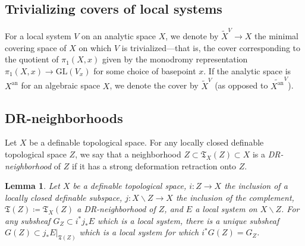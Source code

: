 \documentclass{amsart}
\newcommand{\bs}{\backslash}
\newcommand{\an}{\operatorname{an}}
\newtheorem{lemma}[theorem]{Lemma}
\theoremstyle{definition}
\theoremstyle{remark}
\def\fT{\mathfrak{T}}
\def\an{\mathrm{an}}
\def\fT{\mathfrak{T}}
\numberwithin{equation}{section}
\begin{document}
\subsection{Trivializing covers of local systems}\label{subsect:covers}
For a local system $V$ on an analytic space $X$, we denote by $\widetilde {X}^V\to X$ the minimal covering space of $X$ on which $V$ is trivialized---that is, the cover corresponding to the quotient of $\pi_1(X,x)$ given by the monodromy representation $\pi_1(X,x)\to \mathrm{GL}(V_x)$ for some choice of basepoint $x$.  If the analytic space is $X^\an$ for an algebraic space $X$, we denote the cover by $\widetilde{X}^V$ (as opposed to $\widetilde{X^\an}^V$).  



\subsection{DR-neighborhoods}\label{sect:DR}
Let $X$ be a definable topological space. For any locally closed definable topological space $Z$, we say that a neighborhood $Z\subset \fT_X(Z)\subset X$ is a \textit{DR-neighborhood} of $Z$ if it has a strong deformation retraction onto $Z$.


\begin{lemma}\label{lem:subsgood}Let $X$ be a definable topological space, $i:Z\to X$ the inclusion of a locally closed definable subspace, $j:X\bs Z\to X$ the inclusion of the complement, $\mathfrak{T}(Z)\coloneqq  \fT_X(Z)$ a DR-neighborhood of $Z$, and $E$ a local system on $X\bs Z$.  For any subsheaf $G_Z\subset i^*j_*E$ which is a local system, there is a unique subsheaf $G(Z)\subset j_*E|_{\mathfrak{T}(Z)}$ which is a local system for which $i^*G(Z)=G_Z$.
\end{lemma}
\end{document}
